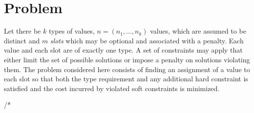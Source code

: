 \section{Problem}

Let there be $k$ types of values, $n=(n_1, ..., n_k)$ values, which are assumed to be distinct and $m$ \textit{slots} which may be optional and associated with a penalty. 
Each value and each slot are of exactly one type.
A set of constraints may apply that either limit the set of possible solutions or impose a penalty on solutions violating them.
The problem considered here consists of finding an assignment of a value to each slot so that both the type requirement and any additional hard constraint is satisfied and the cost incurred by violated soft constraints is minimized.

/*




